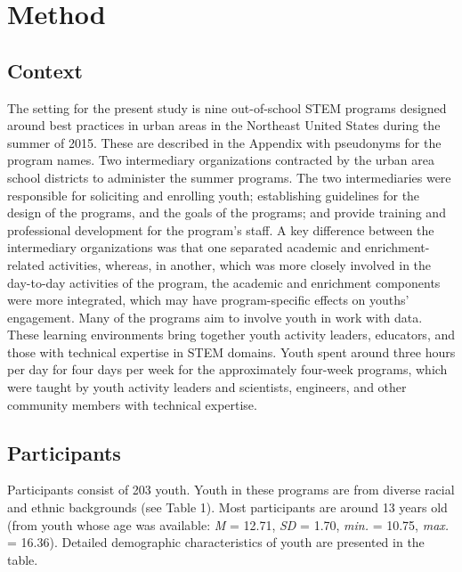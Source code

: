 \documentclass[]{book}
\theoremstyle{definition}
\theoremstyle{definition}
\theoremstyle{definition}
\theoremstyle{remark}
\begin{document}
\chapter{Method}\label{method}

\section{Context}\label{context}

The setting for the present study is nine out-of-school STEM programs
designed around best practices in urban areas in the Northeast United
States during the summer of 2015. These are described in the Appendix
with pseudonyms for the program names. Two intermediary organizations
contracted by the urban area school districts to administer the summer
programs. The two intermediaries were responsible for soliciting and
enrolling youth; establishing guidelines for the design of the programs,
and the goals of the programs; and provide training and professional
development for the program's staff. A key difference between the
intermediary organizations was that one separated academic and
enrichment-related activities, whereas, in another, which was more
closely involved in the day-to-day activities of the program, the
academic and enrichment components were more integrated, which may have
program-specific effects on youths' engagement. Many of the programs aim
to involve youth in work with data. These learning environments bring
together youth activity leaders, educators, and those with technical
expertise in STEM domains. Youth spent around three hours per day for
four days per week for the approximately four-week programs, which were
taught by youth activity leaders and scientists, engineers, and other
community members with technical expertise.

\section{Participants}\label{participants}

Participants consist of 203 youth. Youth in these programs are from
diverse racial and ethnic backgrounds (see Table 1). Most participants
are around 13 years old (from youth whose age was available: \emph{M} =
12.71, \emph{SD} = 1.70, \emph{min.} = 10.75, \emph{max.} = 16.36).
Detailed demographic characteristics of youth are presented in the
table.
\end{document}
